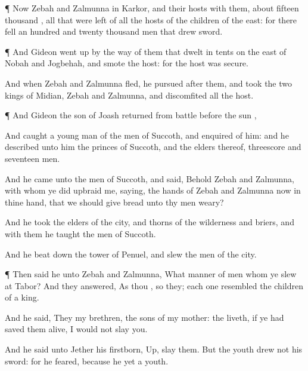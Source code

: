 {\par }{\PP {}¶ Now
Zebah and
Zalmunna
{} in
Karkor, and their
hosts with them, about
fifteen
thousand
{}, all that were
left of all the
hosts of the
children of the
east: for there
fell an
hundred and
twenty
thousand
men that
drew
sword.


\par }{\PP {}¶ And
Gideon went
up by the
way of them that
dwelt in
tents on the
east of
Nobah and
Jogbehah, and
smote the
host: for the
host was
secure.

And when
Zebah and
Zalmunna
fled, he
pursued
after them, and
took the
two
kings of
Midian,
Zebah and
Zalmunna, and
discomfited all the
host.


\par }{\PP {}¶ And
Gideon the
son of
Joash
returned from
battle
before the
sun
{},

And
caught a young
man of the
men of
Succoth, and
enquired of him: and he
described unto him the
princes of
Succoth, and the
elders thereof,
{} threescore and
seventeen
men.

And he
came unto the
men of
Succoth, and
said, Behold
Zebah and
Zalmunna, with whom ye did
upbraid me,
saying,
{} the
hands of
Zebah and
Zalmunna now in thine
hand, that we should
give
bread unto thy
men
{}
weary?

And he
took the
elders of the
city, and
thorns of the
wilderness and
briers, and with them he
taught the
men of
Succoth.

And he beat
down the
tower of
Penuel, and
slew the
men of the
city.


\par }{\PP {}¶ Then
said he unto
Zebah and
Zalmunna,
What manner of
men
{} whom ye
slew at
Tabor? And they
answered, As
thou
{}, so
{} they; each
one
resembled the
children of a
king.

And he
said, They
{} my
brethren,
{} the
sons of my
mother:
{} the
{}
liveth,
if ye had saved them
alive, I would not
slay you.

And he
said unto
Jether his
firstborn,
Up,
{}
slay them. But the
youth
drew not his
sword: for he
feared, because he
{} yet a
youth.

}

